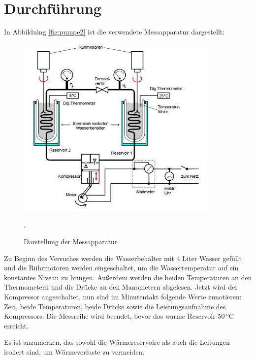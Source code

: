 \section{Durchführung}
In Abbilduing \ref{fig:pumpe2} ist die verwendete Messapparatur dargestellt:
\begin{figure}[H]
  \centering
  \includegraphics[height=9cm]{pumpe2.JPG}
  \caption{Darstellung der Messapparatur}
  \cite{skript}.
  \label{pumpe2}
\end{figure}

Zu Beginn des Versuches werden die Wasserbehälter mit 4 Liter Wasser gefüllt und
die Rührmotoren werden eingeschaltet, um die Wassertemperatur auf ein konstantes
Niveau zu bringen. Außerdem werden die beiden Temperaturen an den Thermometern und die Drücke an den Manometern abgelesen.
Jetzt wird der Kompressor angeschaltet, nun sind im Minutentakt folgende Werte zunotieren:
Zeit, beide Temperaturen, beide Drücke sowie die Leistungsaufnahme des Kompressors.
Die Messreihe wird beendet, bevor das warme Reservoir $\SI{50}{\celsius}$ erreicht.

Es ist anzumerken, das sowohl die Wärmereservoire als auch die Leitungen isoliert sind,
um Wärmeverluste zu vermeiden.


\label{sec:Durchführung}
